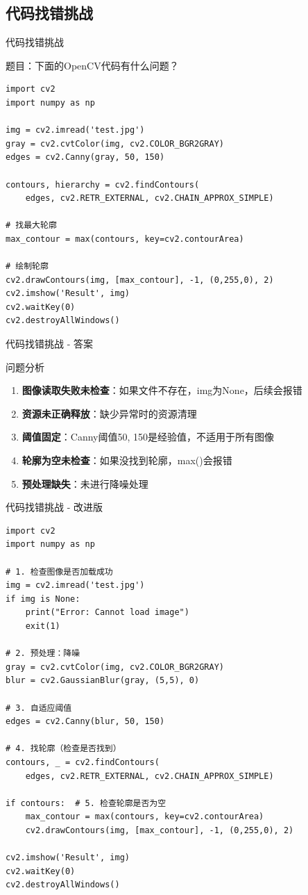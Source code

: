 \documentclass[aspectratio=169, 10pt]{beamer}
\begin{document}
\subsection{代码找错挑战}
\begin{frame}[fragile]{代码找错挑战}
	\begin{block}{题目：下面的OpenCV代码有什么问题？}
		\lstset{language=Python}
		\begin{lstlisting}
import cv2
import numpy as np

img = cv2.imread('test.jpg')
gray = cv2.cvtColor(img, cv2.COLOR_BGR2GRAY)
edges = cv2.Canny(gray, 50, 150)

contours, hierarchy = cv2.findContours(
    edges, cv2.RETR_EXTERNAL, cv2.CHAIN_APPROX_SIMPLE)

# 找最大轮廓
max_contour = max(contours, key=cv2.contourArea)

# 绘制轮廓
cv2.drawContours(img, [max_contour], -1, (0,255,0), 2)
cv2.imshow('Result', img)
cv2.waitKey(0)
cv2.destroyAllWindows()
		\end{lstlisting}
	\end{block}
\end{frame}

\begin{frame}[fragile]{代码找错挑战 - 答案}
	\begin{block}{问题分析}
		\begin{enumerate}
			\item \textbf{图像读取失败未检查}：如果文件不存在，img为None，后续会报错
			\item \textbf{资源未正确释放}：缺少异常时的资源清理
			\item \textbf{阈值固定}：Canny阈值50, 150是经验值，不适用于所有图像
			\item \textbf{轮廓为空未检查}：如果没找到轮廓，max()会报错
			\item \textbf{预处理缺失}：未进行降噪处理
		\end{enumerate}
	\end{block}
\end{frame}

\begin{frame}[fragile]{代码找错挑战 - 改进版}
	\lstset{language=Python}
	\begin{lstlisting}
import cv2
import numpy as np

# 1. 检查图像是否加载成功
img = cv2.imread('test.jpg')
if img is None:
    print("Error: Cannot load image")
    exit(1)

# 2. 预处理：降噪
gray = cv2.cvtColor(img, cv2.COLOR_BGR2GRAY)
blur = cv2.GaussianBlur(gray, (5,5), 0)

# 3. 自适应阈值
edges = cv2.Canny(blur, 50, 150)

# 4. 找轮廓（检查是否找到）
contours, _ = cv2.findContours(
    edges, cv2.RETR_EXTERNAL, cv2.CHAIN_APPROX_SIMPLE)

if contours:  # 5. 检查轮廓是否为空
    max_contour = max(contours, key=cv2.contourArea)
    cv2.drawContours(img, [max_contour], -1, (0,255,0), 2)

cv2.imshow('Result', img)
cv2.waitKey(0)
cv2.destroyAllWindows()
	\end{lstlisting}
\end{frame}
\end{document}
